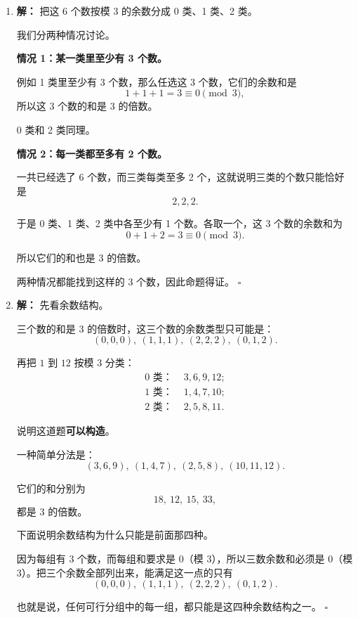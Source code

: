 \documentclass[11pt,a4paper,fontset=fandol]{ctexart}
\theoremstyle{formalexample}
\newenvironment{solution}{\par\noindent\textbf{解：}}{\hfill$\square$\par}
\begin{document}
\begin{enumerate}
  \item \begin{solution}
  把这 6 个数按模 $3$ 的余数分成 0 类、1 类、2 类。

  我们分两种情况讨论。

  \textbf{情况 1：某一类里至少有 3 个数。}

  例如 1 类里至少有 3 个数，那么任选这 3 个数，它们的余数和是
  \[
  1+1+1=3\equiv 0\pmod 3,
  \]
  所以这 3 个数的和是 $3$ 的倍数。

  0 类和 2 类同理。

  \textbf{情况 2：每一类都至多有 2 个数。}

  一共已经选了 $6$ 个数，而三类每类至多 2 个，这就说明三类的个数只能恰好是
  \[
  2,2,2.
  \]

  于是 0 类、1 类、2 类中各至少有 1 个数。各取一个，这 3 个数的余数和为
  \[
  0+1+2=3\equiv 0\pmod 3.
  \]

  所以它们的和也是 $3$ 的倍数。

  两种情况都能找到这样的 3 个数，因此命题得证。
  \end{solution}

  \item \begin{solution}
  先看余数结构。

  三个数的和是 $3$ 的倍数时，这三个数的余数类型只可能是：
  \[
  (0,0,0),\ (1,1,1),\ (2,2,2),\ (0,1,2).
  \]

  再把 $1$ 到 $12$ 按模 $3$ 分类：
  \[
  \begin{aligned}
  0\text{ 类： }&3,6,9,12;\\
  1\text{ 类： }&1,4,7,10;\\
  2\text{ 类： }&2,5,8,11.
  \end{aligned}
  \]

  说明这道题\textbf{可以构造}。

  一种简单分法是：
  \[
  (3,6,9),\ (1,4,7),\ (2,5,8),\ (10,11,12).
  \]

  它们的和分别为
  \[
  18,\ 12,\ 15,\ 33,
  \]
  都是 $3$ 的倍数。

  下面说明余数结构为什么只能是前面那四种。

  因为每组有 3 个数，而每组和要求是 $0$（模 $3$），所以三数余数和必须是 $0$（模 $3$）。把三个余数全部列出来，能满足这一点的只有
  \[
  (0,0,0),\ (1,1,1),\ (2,2,2),\ (0,1,2).
  \]

  也就是说，任何可行分组中的每一组，都只能是这四种余数结构之一。
  \end{solution}


\end{enumerate}
\end{document}
